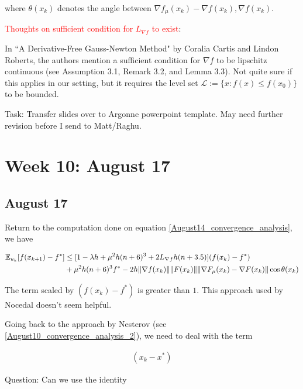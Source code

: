 \documentclass{article}
\begin{document}
where $\theta(x_k)$ denotes the angle between $\nabla f_{\mu}(x_k) - \nabla f(x_k), \nabla f(x_k)$. \newline 

\textcolor{red}{Thoughts on sufficient condition for $L_{\nabla f}$ to exist}: \newline 

In ``A Derivative-Free Gauss-Newton Method" by Coralia Cartis and Lindon Roberts, the authors mention a sufficient condition for $\nabla f$ to be lipschitz continuous (see Assumption 3.1, Remark 3.2, and Lemma 3.3). Not quite sure if this applies in our setting, but it requires the level set $\mathcal{L}:= \{x : f(x) \leq f(x_0)\}$ to be bounded. \newline   

Task: Transfer slides over to Argonne powerpoint template. May need further revision before I send to Matt/Raghu. 

\section{Week 10: August 17}


\subsection{August 17}

Return to the computation done on equation \eqref{August14_convergence_analysis}, we have 

\begin{align}
\mathbb{E}_{u_k}[f(x_{k+1})-f^*] & \leq [1-\lambda h + \mu^2h(n+6)^3 + 2L_{\nabla f}h(n+3.5)](f(x_k)-f^*) \notag \\ & + \mu^2h(n+6)^3f^* -2h\|\nabla f(x_k)\| \|F(x_k)\| \|\nabla F_{\mu}(x_k) - \nabla F(x_k)\| \cos \theta(x_k)
\end{align}

The term scaled by $(f(x_k)-f^*)$ is greater than $1$. This approach used by Nocedal doesn't seem helpful. \newline 

Going back to the approach by Nesterov (see \eqref{August10_convergence_analysis_2}), we need to deal with the term 

\begin{align*}
[\mathbb{E}_{u_k}g_{\mu}(x_k) - \nabla f_{\mu}(x_k)](x_k-x^*)
\end{align*}

Question: Can we use the identity 
\end{document}

